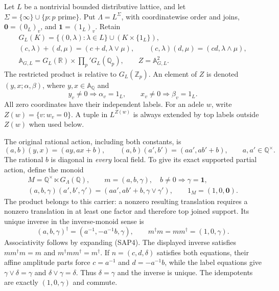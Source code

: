 Let $L$ be a nontrivial bounded distributive lattice, and let
$\Sigma=\{\infty\}\cup\{p:p\text{ prime}\}$. Put
$\Lambda=L^\Sigma$, with coordinatewise order and joins,
$\boldsymbol0=(0_L)_v$, and $\boldsymbol1=(1_L)_v$. Retain
\begin{equation}\tag{SAP1}
\begin{gathered}
G_L(K)=\{(0,\lambda):\lambda\in L\}\cup(K\times\{1_L\}),\\
(c,\lambda)+(d,\mu)=(c+d,\lambda\vee\mu),\qquad
(c,\lambda)(d,\mu)=(cd,\lambda\wedge\mu),\\
\mathbb A_{G,L}=G_L(\mathbb R)\times\prod_p'G_L(\mathbb Q_p),
\qquad Z=\mathbb A_{G,L}^{2}.
\end{gathered}
\end{equation}
The restricted product is relative to $G_L(\mathbb Z_p)$.
An element of $Z$ is denoted $(y,x;\alpha,\beta)$, where
$y,x\in\mathbb A_{\mathbb Q}$ and
\begin{equation}\tag{SAP2}
y_v\ne0\Longrightarrow\alpha_v=1_L,\qquad
x_v\ne0\Longrightarrow\beta_v=1_L.
\end{equation}
All zero coordinates have their independent labels. For an adele
$w$, write $Z(w)=\{v:w_v=0\}$. A tuple in $L^{Z(w)}$ is always
extended by top labels outside $Z(w)$ when used below.

The original rational action, including both constants, is
\begin{equation}\tag{SAP3}
(a,b)(y,x)=(ay,ax+b),\qquad
(a,b)(a',b')=(aa',ab'+b),\qquad a,a'\in\mathbb Q^\times.
\end{equation}
The rational $b$ is diagonal in \emph{every} local field.
To give its exact supported partial action, define the monoid
\begin{equation}\tag{SAP4}
\begin{gathered}
M=\mathbb Q^\times\ltimes G_\Lambda(\mathbb Q),\qquad
m=(a,b,\gamma),\quad b\ne0\Longrightarrow\gamma=\boldsymbol1,\\
(a,b,\gamma)(a',b',\gamma')
 =(aa',ab'+b,\gamma\vee\gamma'),\qquad
1_M=(1,0,\boldsymbol0).
\end{gathered}
\end{equation}
The product belongs to this carrier: a nonzero resulting translation
requires a nonzero translation in at least one factor and therefore
top joined support. Its unique inverse in the inverse-monoid sense is
\begin{equation}\tag{SAP5}
(a,b,\gamma)^\dagger=(a^{-1},-a^{-1}b,\gamma),\qquad
m^\dagger m=mm^\dagger=(1,0,\gamma).
\end{equation}
Associativity follows by expanding (SAP4). The displayed inverse
satisfies $mm^\dagger m=m$ and $m^\dagger mm^\dagger=m^\dagger$.
If $n=(c,d,\delta)$ satisfies both equations, their affine amplitude
parts force $c=a^{-1}$ and $d=-a^{-1}b$, while the label equations
give $\gamma\vee\delta=\gamma$ and
$\delta\vee\gamma=\delta$. Thus $\delta=\gamma$ and the inverse
is unique. The idempotents are exactly $(1,0,\gamma)$ and commute.

